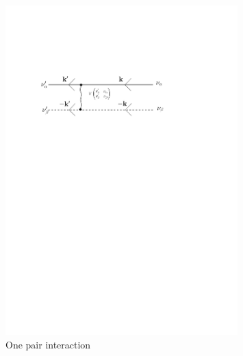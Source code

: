 \documentclass[11pt]{article} %
\begin{document}
\begin{figure}[htbp]
\begin{center}
\includegraphics[width=0.8\textwidth]{VPair}
\caption{One pair interaction\label{fig:VPair}} 

\end{center}
\end{figure}
\end{document}
